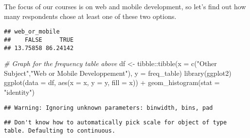 \documentclass[
]{article}
\newenvironment{Shaded}{\begin{snugshade}}{\end{snugshade}}
\newcommand{\AttributeTok}[1]{\textcolor[rgb]{0.77,0.63,0.00}{#1}}
\newcommand{\CommentTok}[1]{\textcolor[rgb]{0.56,0.35,0.01}{\textit{#1}}}
\newcommand{\DecValTok}[1]{\textcolor[rgb]{0.00,0.00,0.81}{#1}}
\newcommand{\FunctionTok}[1]{\textcolor[rgb]{0.00,0.00,0.00}{#1}}
\newcommand{\NormalTok}[1]{#1}
\newcommand{\OtherTok}[1]{\textcolor[rgb]{0.56,0.35,0.01}{#1}}
\newcommand{\SpecialCharTok}[1]{\textcolor[rgb]{0.00,0.00,0.00}{#1}}
\newcommand{\StringTok}[1]{\textcolor[rgb]{0.31,0.60,0.02}{#1}}
\begin{document}
The focus of our courses is on web and mobile development, so let's find
out how many respondents chose at least one of these two options.

\begin{Shaded}
\end{Shaded}

\begin{verbatim}
## web_or_mobile
##    FALSE     TRUE 
## 13.75858 86.24142
\end{verbatim}

\begin{Shaded}
\begin{Highlighting}[]
\CommentTok{\# Graph for the frequency table above}
\NormalTok{df }\OtherTok{\textless{}{-}}\NormalTok{ tibble}\SpecialCharTok{::}\FunctionTok{tibble}\NormalTok{(}\AttributeTok{x =} \FunctionTok{c}\NormalTok{(}\StringTok{"Other Subject"}\NormalTok{,}\StringTok{"Web or Mobile Developpement"}\NormalTok{),}
                       \AttributeTok{y =}\NormalTok{ freq\_table)}
 \FunctionTok{library}\NormalTok{(ggplot2)}
 \FunctionTok{ggplot}\NormalTok{(}\AttributeTok{data =}\NormalTok{ df, }\FunctionTok{aes}\NormalTok{(}\AttributeTok{x =}\NormalTok{ x, }\AttributeTok{y =}\NormalTok{ y, }\AttributeTok{fill =}\NormalTok{ x)) }\SpecialCharTok{+}
   \FunctionTok{geom\_histogram}\NormalTok{(}\AttributeTok{stat =} \StringTok{"identity"}\NormalTok{)}
\end{Highlighting}
\end{Shaded}

\begin{verbatim}
## Warning: Ignoring unknown parameters: binwidth, bins, pad
\end{verbatim}

\begin{verbatim}
## Don't know how to automatically pick scale for object of type table. Defaulting to continuous.
\end{verbatim}
\end{document}
